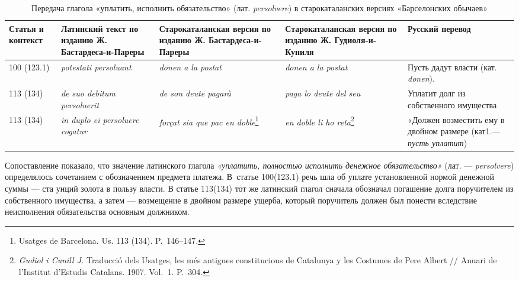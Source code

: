 \begin{center}
\small
\setlength{\tabcolsep}{2pt}
\begin{longtable}{|p{}|p{}|p{}|p{}|p{}|}
\caption{Передача глагола «уплатить, исполнить обязательство» (лат. \emph{persolvere}) в старокаталанских версиях «Барселонских обычаев»}\label{tab:ch2-persolvere}\\
\hline
\textbf{Статья и контекст} & \textbf{Латинский текст по изданию Ж. Бастардеса-и-Пареры} & \textbf{Старокаталанская версия по изданию Ж. Бастардеса-и-Пареры} & \textbf{Старокаталанская версия по изданию Ж. Гудиоля-и-Куниля} & \textbf{Русский перевод} \\ \hline
100 (123.1) & \emph{potestati persoluant} & \emph{donen a la postat} & \emph{donen a la postat} & Пусть дадут власти (кат. \emph{donen}). \\ \hline
113 (134) & \emph{de suo debitum persoluerit} & \emph{de son deute pagarà} & \emph{paga lo deute del seu} & Уплатит долг из собственного имущества \\ \hline
113 (134) & \emph{in duplo ei persoluere cogatur} & \emph{forçat sia que pac en doble}\footnote{Usatges de Barcelona. Us. 113 (134). P.~146--147.} & \emph{en doble li ho reta}\footnote{\emph{Gudiol i Cunill J. }Traducció dels Usatges, les més antigues constitucions de Catalunya y les Costumes de Pere Albert // Anuari de l’Institut d’Estudis Catalans. 1907. Vol.~1. P.~304.} & «Должен возместить ему в двойном размере (кат1.--- \emph{п}\emph{усть уплатит}) \\ \hline
\end{longtable}
\end{center}

Сопоставление показало, что значение латинского глагола \emph{«уплатить, полностью исполнить денежное обязательство» }(лат. --- \emph{persolvere}) определялось сочетанием с обозначением предмета платежа. В~статье 100(123.1) речь шла об уплате установленной нормой денежной суммы --- ста унций золота в пользу власти. В статье 113(134) тот же латинский глагол сначала обозначал погашение долга поручителем из собственного имущества, а затем --- возмещение в двойном размере ущерба, который поручитель должен был понести вследствие неисполнения обязательства основным должником.


